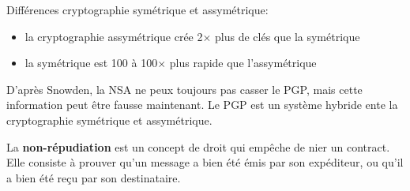 Différences cryptographie symétrique et assymétrique:
\begin{itemize}
	\item la cryptographie assymétrique crée 2$\times$ plus de clés que la symétrique
	\item la symétrique est 100 à 100$\times$ plus rapide que l'assymétrique
\end{itemize}

D'après Snowden, la NSA ne peux toujours pas casser le PGP, mais cette information peut être fausse maintenant.
Le PGP est un système hybride ente la cryptographie symétrique et assymétrique.

La \textbf{non-répudiation} est un concept de droit qui empêche de nier un contract. Elle consiste à prouver qu'un 
message a bien été émis par son expéditeur, ou qu'il a bien été reçu par son destinataire.
